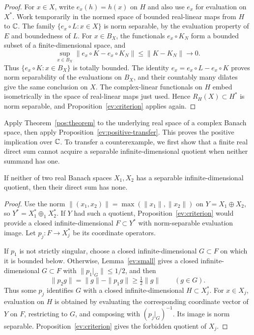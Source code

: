 \begin{proof}
For $x\in X$, write $e_x(h)=h(x)$ on $H$ and also use $e_x$ for
evaluation on $X^*$.  Work temporarily in the normed space of bounded
real-linear maps from $H$ to $\mathbb C$.
The family $\{e_x\circ L:x\in X\}$ is norm separable, by the evaluation
property of $E$ and boundedness of $L$.
For $x\in B_X$, the functionals $e_x\circ K_N$ form a bounded subset of
a finite-dimensional space, and
\[
 \sup_{x\in B_X}\|e_x\circ K-e_x\circ K_N\|
 \le\|K-K_N\|\longrightarrow0.
\]
Thus $\{e_x\circ K:x\in B_X\}$ is totally bounded.  The identity
$e_x=e_x\circ L-e_x\circ K$ proves norm separability of the evaluations
on $B_X$, and their countably many dilates give the same conclusion on
$X$.  The complex-linear functionals on $H$ embed isometrically in the
space of real-linear maps just used.  Hence $R_H(X)\subset H^*$ is norm
separable, and Proposition~\ref{ev:criterion} applies again.
\end{proof}

Apply Theorem~\ref{pos:theorem} to the underlying real space of a complex
Banach space, then apply Proposition~\ref{ev:positive-transfer}. This
proves the positive implication over $\mathbb C$. To transfer a counterexample, we first show that
a finite real direct sum cannot acquire a separable infinite-dimensional
quotient when neither summand has one.

\begin{lemma}\label{ev:finite-sum}
If neither of two real Banach spaces $X_1,X_2$ has a separable
infinite-dimensional quotient, then their direct sum has none.
\end{lemma}

\begin{proof}
Use the norm $\|(x_1,x_2)\|=\max(\|x_1\|,\|x_2\|)$ on
$Y=X_1\oplus X_2$, so $Y^*=X_1^*\oplus_1X_2^*$.
If $Y$ had such a quotient, Proposition~\ref{ev:criterion} would provide
a closed infinite-dimensional $F\subset Y^*$ with norm-separable
evaluation image.  Let $p_j:F\to X_j^*$ be its coordinate operators.

If $p_1$ is not strictly singular, choose a closed infinite-dimensional
$G\subset F$ on which it is bounded below.  Otherwise,
Lemma~\ref{ev:small} gives a closed infinite-dimensional $G\subset F$
with $\|p_1|_G\|\le1/2$, and then
\[
 \|p_2g\|=\|g\|-\|p_1g\|\ge\tfrac12\|g\|\qquad(g\in G).
\]
Thus some $p_j$ identifies $G$ with a closed infinite-dimensional
$H\subset X_j^*$.  For $x\in X_j$, evaluation on $H$ is obtained by
evaluating the corresponding coordinate vector of $Y$ on $F$,
restricting to $G$, and composing with $(p_j|_G)^{-1}$.
Its image is norm separable.  Proposition~\ref{ev:criterion} gives the
forbidden quotient of $X_j$.
\end{proof}

